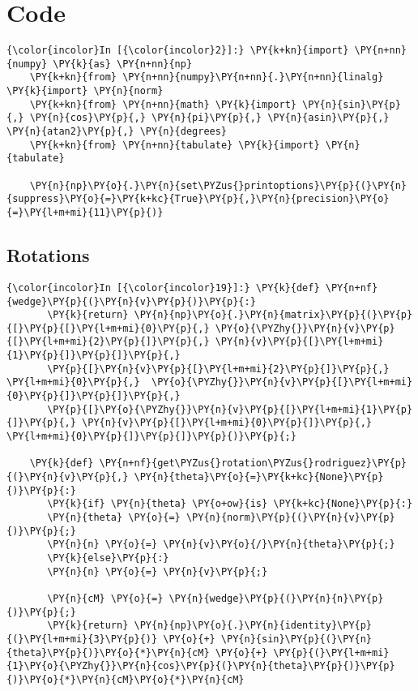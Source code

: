 \documentclass[a4paper]{scrreprt}
\begin{document}
\chapter{Code}

\begin{Verbatim}[commandchars=\\\{\}]
{\color{incolor}In [{\color{incolor}2}]:} \PY{k+kn}{import} \PY{n+nn}{numpy} \PY{k}{as} \PY{n+nn}{np}
	\PY{k+kn}{from} \PY{n+nn}{numpy}\PY{n+nn}{.}\PY{n+nn}{linalg} \PY{k}{import} \PY{n}{norm}
	\PY{k+kn}{from} \PY{n+nn}{math} \PY{k}{import} \PY{n}{sin}\PY{p}{,} \PY{n}{cos}\PY{p}{,} \PY{n}{pi}\PY{p}{,} \PY{n}{asin}\PY{p}{,} \PY{n}{atan2}\PY{p}{,} \PY{n}{degrees}
	\PY{k+kn}{from} \PY{n+nn}{tabulate} \PY{k}{import} \PY{n}{tabulate}
	
	\PY{n}{np}\PY{o}{.}\PY{n}{set\PYZus{}printoptions}\PY{p}{(}\PY{n}{suppress}\PY{o}{=}\PY{k+kc}{True}\PY{p}{,}\PY{n}{precision}\PY{o}{=}\PY{l+m+mi}{11}\PY{p}{)}
\end{Verbatim}


\section{Rotations}\label{rotations}

\begin{Verbatim}[commandchars=\\\{\}]
{\color{incolor}In [{\color{incolor}19}]:} \PY{k}{def} \PY{n+nf}{wedge}\PY{p}{(}\PY{n}{v}\PY{p}{)}\PY{p}{:}
	   \PY{k}{return} \PY{n}{np}\PY{o}{.}\PY{n}{matrix}\PY{p}{(}\PY{p}{[}\PY{p}{[}\PY{l+m+mi}{0}\PY{p}{,} \PY{o}{\PYZhy{}}\PY{n}{v}\PY{p}{[}\PY{l+m+mi}{2}\PY{p}{]}\PY{p}{,} \PY{n}{v}\PY{p}{[}\PY{l+m+mi}{1}\PY{p}{]}\PY{p}{]}\PY{p}{,}
	   \PY{p}{[}\PY{n}{v}\PY{p}{[}\PY{l+m+mi}{2}\PY{p}{]}\PY{p}{,} \PY{l+m+mi}{0}\PY{p}{,}  \PY{o}{\PYZhy{}}\PY{n}{v}\PY{p}{[}\PY{l+m+mi}{0}\PY{p}{]}\PY{p}{]}\PY{p}{,}
	   \PY{p}{[}\PY{o}{\PYZhy{}}\PY{n}{v}\PY{p}{[}\PY{l+m+mi}{1}\PY{p}{]}\PY{p}{,} \PY{n}{v}\PY{p}{[}\PY{l+m+mi}{0}\PY{p}{]}\PY{p}{,} \PY{l+m+mi}{0}\PY{p}{]}\PY{p}{]}\PY{p}{)}\PY{p}{;}
	
	\PY{k}{def} \PY{n+nf}{get\PYZus{}rotation\PYZus{}rodriguez}\PY{p}{(}\PY{n}{v}\PY{p}{,} \PY{n}{theta}\PY{o}{=}\PY{k+kc}{None}\PY{p}{)}\PY{p}{:}
	   \PY{k}{if} \PY{n}{theta} \PY{o+ow}{is} \PY{k+kc}{None}\PY{p}{:}
	   \PY{n}{theta} \PY{o}{=} \PY{n}{norm}\PY{p}{(}\PY{n}{v}\PY{p}{)}\PY{p}{;} 
	   \PY{n}{n} \PY{o}{=} \PY{n}{v}\PY{o}{/}\PY{n}{theta}\PY{p}{;} 
	   \PY{k}{else}\PY{p}{:} 
	   \PY{n}{n} \PY{o}{=} \PY{n}{v}\PY{p}{;} 
	
	   \PY{n}{cM} \PY{o}{=} \PY{n}{wedge}\PY{p}{(}\PY{n}{n}\PY{p}{)}\PY{p}{;} 
	   \PY{k}{return} \PY{n}{np}\PY{o}{.}\PY{n}{identity}\PY{p}{(}\PY{l+m+mi}{3}\PY{p}{)} \PY{o}{+} \PY{n}{sin}\PY{p}{(}\PY{n}{theta}\PY{p}{)}\PY{o}{*}\PY{n}{cM} \PY{o}{+} \PY{p}{(}\PY{l+m+mi}{1}\PY{o}{\PYZhy{}}\PY{n}{cos}\PY{p}{(}\PY{n}{theta}\PY{p}{)}\PY{p}{)}\PY{o}{*}\PY{n}{cM}\PY{o}{*}\PY{n}{cM}
\end{Verbatim}
\end{document}
